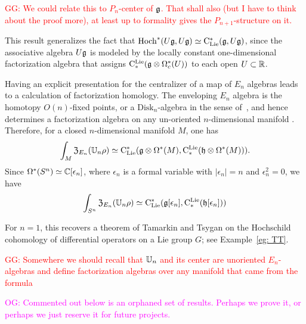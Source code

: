\documentclass[11pt]{amsart}
\numberwithin{equation}{section}
\def\owen{\textcolor{magenta}{OG: }\textcolor{magenta}}
\def\greg{\textcolor{red}{GG: }\textcolor{red}}
\begin{document}
\greg{We could relate this to $P_n$-center of $\mathfrak g$. That shall also (but I have to think about the proof more), 
at least up to formality gives the $P_{n+1}$-structure on it. }

This result generalizes the fact that ${\rm Hoch}^*(U\mathfrak g,U\mathfrak g) \simeq {\rm C}_{\rm Lie}^*(\mathfrak g, U\mathfrak g)$, 
since the associative algebra $U\mathfrak g$ is modeled by the locally constant one-dimensional factorization algebra that assigns
${\rm C}^{\rm Lie}_* (\mathfrak g \otimes \Omega^*_c(U))$ to each open $U \subset \mathbb R$. 

Having an explicit presentation for the centralizer of a map of $E_n$ algebras leads to a calculation of factorization homology.
The enveloping $E_n$ algebra is the homotopy $O(n)$-fixed points, or a $\mathrm{Disk}_n$-algebra in the sense of~\cite{AF},
and hence determines a factorization algebra on any un-oriented $n$-dimensional manifold \cite{Knudsen}.
Therefore, for a closed $n$-dimensional manifold $M$, one has
\[
\int_M {\frak Z}_{E_n}(\mathbb U_n \rho) \simeq {\rm C}_{\rm Lie}^*(\mathfrak g \otimes \Omega^*(M), {\rm C}^{\rm Lie}_*( \mathfrak h \otimes \Omega^*(M))).
\]
Since $\Omega^*(S^n) \simeq \mathbb C[\epsilon_n]$, where $\epsilon_n$ is a formal variable with $|\epsilon_n| = n$ and $\epsilon_n^2 = 0$, we have
\[
\int_{S^n} {\frak Z}_{E_n}(\mathbb U_n \rho) \simeq {\rm C}_{\rm Lie}^*(\mathfrak g[\epsilon_n], {\rm C}^{\rm Lie}_*( \mathfrak h[\epsilon_n]))
\]

For $n=1$, this recovers a theorem of Tamarkin and Tsygan \cite{TT} on the Hochschild cohomology of differential operators on a Lie group $G$;
see Example~\ref{eg: TT}. 

\greg{Somewhere we should recall that $\mathbb U_n$ and its center are unoriented $E_n$-algebras and define factorization algebras over any manifold that came from the formula}

\owen{Commented out below is an orphaned set of results. Perhaps we prove it, or perhaps we just reserve it for future projects.}
%
%
%
%
%
\end{document}

